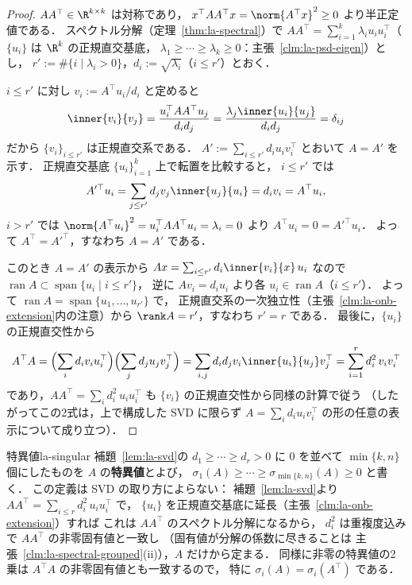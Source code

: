 \begin{proof}
  $AA^\top\in\R^{k\times k}$ は対称であり，
  $x^\top AA^\top x=\norm{A^\top x}^2\geq0$ より半正定値である．
  スペクトル分解（定理~\ref{thm:la-spectral}）で
  $AA^\top=\sum_{i=1}^k\lambda_iu_iu_i^\top$（$\{u_i\}$ は $\R^k$ の正規直交基底，
  $\lambda_1\geq\cdots\geq\lambda_k\geq0$：主張~\ref{clm:la-psd-eigen}）とし，
  $r':=\#\{i\mid\lambda_i>0\}$，$d_i:=\sqrt{\lambda_i}$（$i\leq r'$）とおく．

  $i\leq r'$ に対し $v_i:=A^\top u_i/d_i$ と定めると
  \[
    \inner{v_i}{v_j}
    =\frac{u_i^\top AA^\top u_j}{d_id_j}
    =\frac{\lambda_j\inner{u_i}{u_j}}{d_id_j}
    =\delta_{ij}
  \]
  だから $\{v_i\}_{i\leq r'}$ は正規直交系である．
  $A':=\sum_{i\leq r'}d_iu_iv_i^\top$ とおいて $A=A'$ を示す．
  正規直交基底 $\{u_i\}_{i=1}^k$ 上で転置を比較すると，
  $i\leq r'$ では
  \[
    A'^\top u_i=\sum_{j\leq r'}d_jv_j\inner{u_j}{u_i}=d_iv_i=A^\top u_i,
  \]
  $i>r'$ では $\norm{A^\top u_i}^2=u_i^\top AA^\top u_i=\lambda_i=0$ より
  $A^\top u_i=0=A'^\top u_i$．
  よって $A^\top=A'^\top$，すなわち $A=A'$ である．

  このとき $A=A'$ の表示から
  $Ax=\sum_{i\leq r'}d_i\inner{v_i}{x}\,u_i$ なので
  $\operatorname{ran}A\subset\operatorname{span}\{u_i\mid i\leq r'\}$，
  逆に $Av_i=d_iu_i$ より各 $u_i\in\operatorname{ran}A$（$i\leq r'$）．
  よって $\operatorname{ran}A=\operatorname{span}\{u_1,\dots,u_{r'}\}$ で，
  正規直交系の一次独立性（主張~\ref{clm:la-onb-extension}内の注意）から
  $\rank A=r'$，すなわち $r'=r$ である．
  最後に，$\{u_i\}$ の正規直交性から
  \[
    A^\top A
    =\Bigl(\sum_id_iv_iu_i^\top\Bigr)\Bigl(\sum_jd_ju_jv_j^\top\Bigr)
    =\sum_{i,j}d_id_jv_i\inner{u_i}{u_j}v_j^\top
    =\sum_{i=1}^rd_i^2\,v_iv_i^\top
  \]
  であり，$AA^\top=\sum_id_i^2\,u_iu_i^\top$ も
  $\{v_i\}$ の正規直交性から同様の計算で従う
  （したがってこの2式は，上で構成した SVD に限らず
  $A=\sum_id_iu_iv_i^\top$ の形の任意の表示について成り立つ）．
\end{proof}

\begin{definition}{特異値}{la-singular}
  補題~\ref{lem:la-svd}の $d_1\geq\cdots\geq d_r>0$ に
  $0$ を並べて $\min\{k,n\}$ 個にしたものを $A$ の\textbf{特異値}とよび，
  $\sigma_1(A)\geq\cdots\geq\sigma_{\min\{k,n\}}(A)\geq0$ と書く．
  この定義は SVD の取り方によらない：
  補題~\ref{lem:la-svd}より $AA^\top=\sum_{i\leq r}d_i^2\,u_iu_i^\top$ で，
  $\{u_i\}$ を正規直交基底に延長（主張~\ref{clm:la-onb-extension}）すれば
  これは $AA^\top$ のスペクトル分解になるから，
  $d_i^2$ は重複度込みで $AA^\top$ の非零固有値と一致し
  （固有値が分解の係数に尽きることは
  主張~\ref{clm:la-spectral-grouped}(ii)），$A$ だけから定まる．
  同様に非零の特異値の2乗は $A^\top A$ の非零固有値とも一致するので，
  特に $\sigma_i(A)=\sigma_i(A^\top)$ である．
\end{definition}

